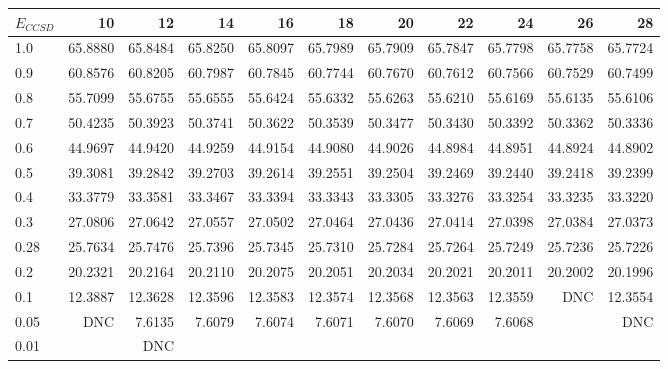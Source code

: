 \begin{landscape}
\begin{table}
\begin{center}
\begin{tabular}{l|rrrrrrrrrr}
\hline 
$E_{CCSD}$ & 10 & 12 & 14 & 16 & 18 & 20 & 22 & 24 & 26 & 28 \\
\hline \hline
1.0 & 65.8880 & 65.8484 & 65.8250 & 65.8097 & 65.7989 & 65.7909 & 65.7847 & 65.7798 & 65.7758 & 65.7724 \\ 
0.9 & 60.8576 & 60.8205 & 60.7987 & 60.7845 & 60.7744 & 60.7670 & 60.7612 & 60.7566 & 60.7529 & 60.7499 \\ 
0.8 & 55.7099 & 55.6755 & 55.6555 & 55.6424 & 55.6332 & 55.6263 & 55.6210 & 55.6169 & 55.6135 & 55.6106 \\ 
0.7 & 50.4235 & 50.3923 & 50.3741 & 50.3622 & 50.3539 & 50.3477 & 50.3430 & 50.3392 & 50.3362 & 50.3336 \\ 
0.6 & 44.9697 & 44.9420 & 44.9259 & 44.9154 & 44.9080 & 44.9026 & 44.8984 & 44.8951 & 44.8924 & 44.8902 \\ 
0.5 & 39.3081 & 39.2842 & 39.2703 & 39.2614 & 39.2551 & 39.2504 & 39.2469 & 39.2440 & 39.2418 & 39.2399 \\ 
0.4 & 33.3779 & 33.3581 & 33.3467 & 33.3394 & 33.3343 & 33.3305 & 33.3276 & 33.3254 & 33.3235 & 33.3220 \\ 
0.3 & 27.0806 & 27.0642 & 27.0557 & 27.0502 & 27.0464 & 27.0436 & 27.0414 & 27.0398 & 27.0384 & 27.0373 \\ 
0.28& 25.7634 & 25.7476 & 25.7396 & 25.7345 & 25.7310 & 25.7284 & 25.7264 & 25.7249 & 25.7236 & 25.7226 \\ 
0.2 & 20.2321 & 20.2164 & 20.2110 & 20.2075 & 20.2051 & 20.2034 & 20.2021 & 20.2011 & 20.2002 & 20.1996 \\ 
0.1 & 12.3887 & 12.3628 & 12.3596 & 12.3583 & 12.3574 & 12.3568 & 12.3563 & 12.3559 &  DNC    & 12.3554 \\ 
0.05& DNC     &  7.6135 &  7.6079 &  7.6074 &  7.6071 &  7.6070 &  7.6069 &  7.6068 &         &     DNC \\
0.01& 	   & DNC &  \\ 
\hline \hline
\end{tabular}
\end{center}
\end{table}
\end{landscape}



